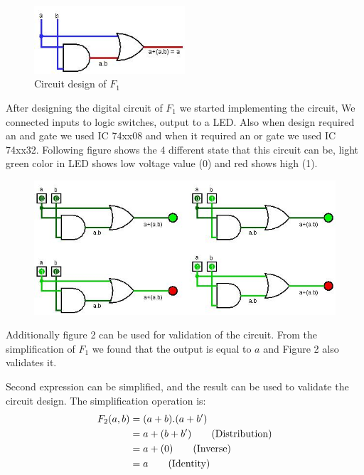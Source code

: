 \documentclass[pdftex,12pt,a4paper]{article}
\begin{document}
\begin{figure}[H]
	\centering
	\includegraphics[width=0.5\textwidth]{E2P1.1.1.jpg}
	\caption{Circuit design of $F_{1}$}
	\label{Figure 1}
\end{figure}

After designing the digital circuit of $F_{1}$ we started implementing the circuit, We connected inputs to logic switches, output to a LED. Also when design required an and gate we used IC 74xx08 and when it required an or gate we used IC 74xx32. Following figure shows the 4 different state that this circuit can be, light green color in LED shows low voltage value (0) and red shows high (1).

\begin{figure}[H]
	\centering
	\includegraphics[width=1\textwidth]{E2P1.1.2.jpg}
	\caption{}
	\label{Figure 2}
\end{figure}

Additionally figure 2 can be used for validation of the circuit. From the simplification of $F_{1}$ we found that the output is equal to $a$ and Figure 2 also validates it. 

\clearpage
Second expression can be simplified, and the result can be used to validate the circuit design. The simplification operation is:
\begin{align}
F_{2}(a,b) &= (a + b) . (a + b')\notag\\ 
&= a + ( b + b' ) \tag{Distribution} \\
&= a + ( 0 ) \tag{Inverse} \\
&= a \tag{Identity} \\
\notag \end{align}
\end{document}
